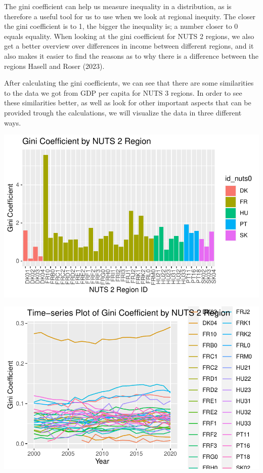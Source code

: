 \documentclass[
  a4paper,
  DIV=11,
  numbers=noendperiod]{scrartcl}
\begin{document}
The gini coefficient can help us measure inequality in a distribution,
as is therefore a useful tool for us to use when we look at regional
inequity. The closer the gini coefficient is to 1, the bigger the
inequality is; a number closer to 0 equals equality. When looking at the
gini coefficient for NUTS 2 regions, we also get a better overview over
differences in income between different regions, and it also makes it
easier to find the reasons as to why there is a difference between the
regions Hasell and Roser (2023).

After calculating the gini coefficients, we can see that there are some
similarities to the data we got from GDP per capita for NUTS 3 regions.
In order to see these similarities better, as well as look for other
important aspects that can be provided trough the calculations, we will
visualize the data in three different ways.

\includegraphics{assignment_1_files/figure-pdf/unnamed-chunk-23-1.pdf}

\includegraphics{assignment_1_files/figure-pdf/unnamed-chunk-24-1.pdf}
\end{document}
